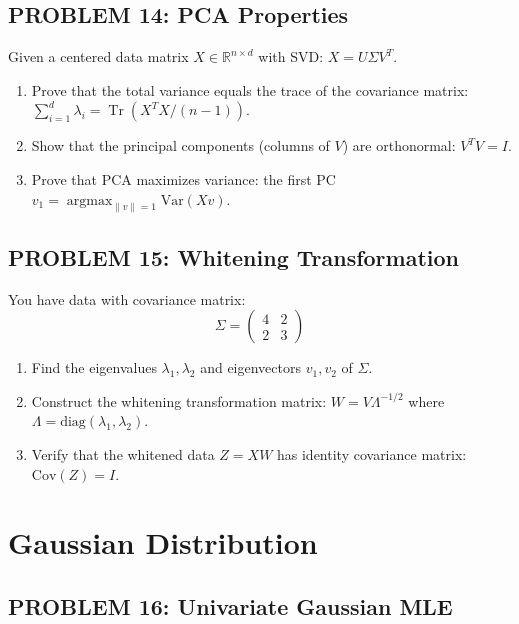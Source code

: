 \documentclass[12pt]{article}
\DeclareMathOperator{\argmax}{argmax}
\DeclareMathOperator{\Tr}{Tr}
\begin{document}
\subsection*{PROBLEM 14: PCA Properties}

Given a centered data matrix \(X \in \mathbb{R}^{n \times d}\) with SVD: \(X = U\Sigma V^T\).

\begin{enumerate}
\item[(a)] Prove that the total variance equals the trace of the covariance matrix: \(\sum_{i=1}^d \lambda_i = \Tr(X^TX/(n-1))\).
\item[(b)] Show that the principal components (columns of \(V\)) are orthonormal: \(V^TV = I\).
\item[(c)] Prove that PCA maximizes variance: the first PC \(v_1 = \argmax_{\|v\|=1} \text{Var}(Xv)\).
\end{enumerate}

\subsection*{PROBLEM 15: Whitening Transformation}

You have data with covariance matrix:
\[
\Sigma = \begin{pmatrix} 4 & 2 \\ 2 & 3 \end{pmatrix}
\]

\begin{enumerate}
\item[(a)] Find the eigenvalues \(\lambda_1, \lambda_2\) and eigenvectors \(v_1, v_2\) of \(\Sigma\).
\item[(b)] Construct the whitening transformation matrix: \(W = V\Lambda^{-1/2}\) where \(\Lambda = \text{diag}(\lambda_1, \lambda_2)\).
\item[(c)] Verify that the whitened data \(Z = XW\) has identity covariance matrix: \(\text{Cov}(Z) = I\).
\end{enumerate}

\newpage
\section*{Gaussian Distribution}

\subsection*{PROBLEM 16: Univariate Gaussian MLE}
\end{document}
